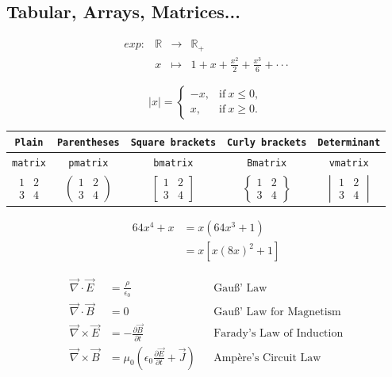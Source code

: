 \documentclass{article} %
\theoremstyle{definition}
\theoremstyle{definition}
\begin{document}
\subsection{Tabular, Arrays, Matrices...}
\[
\begin{array}{cccl}
    exp: & \mathbb{R}& \rightarrow & \mathbb{R}_+\\
     & x & \mapsto & 1+x+\frac{x^2}{2}+\frac{x^3}{6}+ \cdot \cdot \cdot
\end{array}
\]

\[
|x| = \begin{cases}
    -x, & \text{if} \ x \leq 0, \\
     x, & \text{if} \ x \geq 0.
\end{cases}
\]

\begin{tabular}{ccccc}
    \texttt{Plain} & \texttt{Parentheses} & \texttt{Square brackets} & \texttt{Curly brackets} & \texttt{Determinant} \\
    \hline
    \texttt{matrix}& \texttt{pmatrix} & \texttt{bmatrix} & \texttt{Bmatrix} & \texttt{vmatrix} \\
    $\begin{matrix}
        1 & 2 \\
        3 & 4
    \end{matrix} $ & 
    $\begin{pmatrix} 1 & 2 \\ 3 & 4 \end{pmatrix}$ & $\begin{bmatrix} 1 & 2 \\ 3 & 4 \end{bmatrix}$ & $\begin{Bmatrix} 1 & 2 \\ 3 & 4 \end{Bmatrix}$ & $\begin{vmatrix} 1 & 2 \\ 3 & 4 \end{vmatrix}$
\end{tabular}

\begin{align}
    64x^4+x &= x(64x^3+1)\\
    & = x [x(8x)^2+1] 
\end{align}


\begin{align}
    \Vec{\nabla} \cdot \Vec{E} &= \frac{\rho}{\epsilon_0} && \text{Gauß' Law} \\
    \Vec{\nabla} \cdot \Vec{B} &= 0 && \text{Gauß' Law for Magnetism} \\
    \Vec{\nabla} \times \Vec{E} &= -\frac{\partial \Vec{B}}{\partial t} && \text{Farady's Law of Induction}\\
    \Vec{\nabla} \times \Vec{B}  &= \mu_0 \left( \epsilon_0\frac{\partial \Vec{E}}{\partial t}+ \Vec{J} \right) && \text{Ampère's Circuit Law} 
\end{align}
\end{document}
